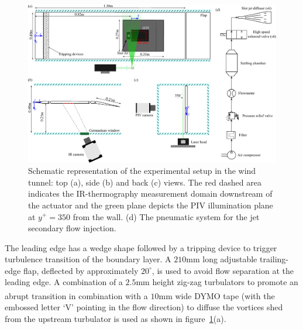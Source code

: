 \begin{figure}[t]
    \centering
    \includegraphics[width = 0.99\linewidth]{figures/F1.pdf}
    \caption{Schematic representation of the experimental setup in the wind tunnel: top (a), side (b) and back (c) views. The red dashed area  indicates the IR-thermography measurement domain downstream of the actuator and the green plane  depicts the PIV illumination plane at $y^+=350$ from the wall. (d) The pneumatic system for the jet secondary flow injection.} \label{fig:SetUp}
\end{figure}

The leading edge has a wedge shape followed by a tripping device to trigger turbulence transition of the boundary layer. A $210\mathrm{mm}$ long adjustable trailing-edge flap, deflected by approximately $20^\circ$, is used to avoid flow separation at the leading edge. A combination of a $2.5\mathrm{mm}$ height zig-zag turbulators to promote an abrupt transition in combination with a $10\mathrm{mm}$ wide DYMO\textsuperscript{\textregistered} tape (with the embossed letter ‘V’ pointing in the flow direction) to diffuse the vortices shed from the upstream turbulator is used as shown in figure~\ref{fig:SetUp}(a). 


